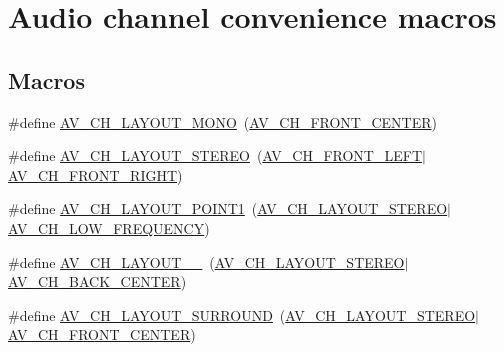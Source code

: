 \hypertarget{group__channel__mask__c}{}\section{Audio channel convenience macros}
\label{group__channel__mask__c}
\subsection*{Macros}
\begin{DoxyCompactItemize}
\item 
\#define \hyperlink{group__channel__mask__c_ga53d6da2dcd56f5f87c7afd8b33fa15ba}{A\+V\+\_\+\+C\+H\+\_\+\+L\+A\+Y\+O\+U\+T\+\_\+\+M\+O\+NO}~(\hyperlink{group__channel__masks_ga88f2868b232a89fd11ad9d6c39d502a1}{A\+V\+\_\+\+C\+H\+\_\+\+F\+R\+O\+N\+T\+\_\+\+C\+E\+N\+T\+ER})
\item 
\#define \hyperlink{group__channel__mask__c_gabc6d6651bba254cd0fa2c42a57228e65}{A\+V\+\_\+\+C\+H\+\_\+\+L\+A\+Y\+O\+U\+T\+\_\+\+S\+T\+E\+R\+EO}~(\hyperlink{group__channel__masks_gaf9c5619f74c99ea8a8606719c01fe7df}{A\+V\+\_\+\+C\+H\+\_\+\+F\+R\+O\+N\+T\+\_\+\+L\+E\+FT}$\vert$\hyperlink{group__channel__masks_ga394b4b2c87790178bf7b683b45320f31}{A\+V\+\_\+\+C\+H\+\_\+\+F\+R\+O\+N\+T\+\_\+\+R\+I\+G\+HT})
\item 
\#define \hyperlink{group__channel__mask__c_ga03f59e18b3598aa0cab9ed675c287a36}{A\+V\+\_\+\+C\+H\+\_\+\+L\+A\+Y\+O\+U\+T\+\_\+P\+O\+I\+N\+T1}~(\hyperlink{group__channel__mask__c_gabc6d6651bba254cd0fa2c42a57228e65}{A\+V\+\_\+\+C\+H\+\_\+\+L\+A\+Y\+O\+U\+T\+\_\+\+S\+T\+E\+R\+EO}$\vert$\hyperlink{group__channel__masks_gab19b66e345cf1f9d50ffc26c28862bcc}{A\+V\+\_\+\+C\+H\+\_\+\+L\+O\+W\+\_\+\+F\+R\+E\+Q\+U\+E\+N\+CY})
\item 
\#define \hyperlink{group__channel__mask__c_gad0badd9c9984bc74290f26c2edfdfe44}{A\+V\+\_\+\+C\+H\+\_\+\+L\+A\+Y\+O\+U\+T\+\_\+\_}~(\hyperlink{group__channel__mask__c_gabc6d6651bba254cd0fa2c42a57228e65}{A\+V\+\_\+\+C\+H\+\_\+\+L\+A\+Y\+O\+U\+T\+\_\+\+S\+T\+E\+R\+EO}$\vert$\hyperlink{group__channel__masks_ga68650a364e52edb62d5984dddec4f935}{A\+V\+\_\+\+C\+H\+\_\+\+B\+A\+C\+K\+\_\+\+C\+E\+N\+T\+ER})
\item 
\#define \hyperlink{group__channel__mask__c_ga625aec7f2285dc35e3ed801e91889564}{A\+V\+\_\+\+C\+H\+\_\+\+L\+A\+Y\+O\+U\+T\+\_\+\+S\+U\+R\+R\+O\+U\+ND}~(\hyperlink{group__channel__mask__c_gabc6d6651bba254cd0fa2c42a57228e65}{A\+V\+\_\+\+C\+H\+\_\+\+L\+A\+Y\+O\+U\+T\+\_\+\+S\+T\+E\+R\+EO}$\vert$\hyperlink{group__channel__masks_ga88f2868b232a89fd11ad9d6c39d502a1}{A\+V\+\_\+\+C\+H\+\_\+\+F\+R\+O\+N\+T\+\_\+\+C\+E\+N\+T\+ER})

\end{DoxyCompactItemize}

